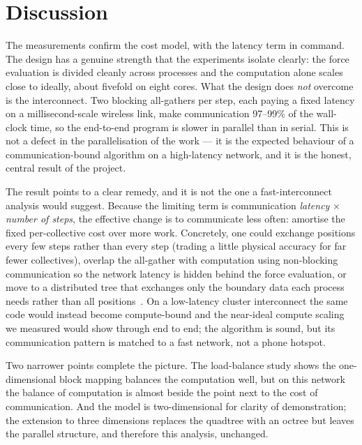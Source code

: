 \documentclass[11pt,a4paper]{article}
\begin{document}
\section{Discussion}
\label{sec:discussion}

The measurements confirm the cost model, with the latency term in command. The
design has a genuine strength that the experiments isolate clearly: the force
evaluation is divided cleanly across processes and the computation alone scales
close to ideally, about fivefold on eight cores. What the design does \emph{not}
overcome is the interconnect. Two blocking all-gathers per step, each paying a
fixed latency on a millisecond-scale wireless link, make communication 97--99\% of
the wall-clock time, so the end-to-end program is slower in parallel than in serial.
This is not a defect in the parallelisation of the work --- it is the expected
behaviour of a communication-bound algorithm on a high-latency network, and it is
the honest, central result of the project.

The result points to a clear remedy, and it is not the one a fast-interconnect
analysis would suggest. Because the limiting term is communication \emph{latency}
$\times$ \emph{number of steps}, the effective change is to communicate less often:
amortise the fixed per-collective cost over more work. Concretely, one could exchange
positions every few steps rather than every step (trading a little physical accuracy
for far fewer collectives), overlap the all-gather with computation using
non-blocking communication so the network latency is hidden behind the force
evaluation, or move to a distributed tree that exchanges only the boundary data each
process needs rather than all positions~\cite{warren1993}. On a low-latency cluster
interconnect the same code would instead become compute-bound and the
near-ideal compute scaling we measured would show through end to end; the algorithm
is sound, but its communication pattern is matched to a fast network, not a phone
hotspot.

Two narrower points complete the picture. The load-balance study shows the
one-dimensional block mapping balances the computation well, but on this network the
balance of computation is almost beside the point next to the cost of
communication. And the model is two-dimensional for clarity of demonstration; the
extension to three dimensions replaces the quadtree with an octree but leaves the
parallel structure, and therefore this analysis, unchanged.
\end{document}
